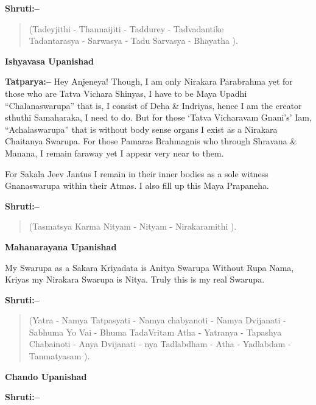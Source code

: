 \textbf{Shruti:–}

\begin{verse}
(Tadeyjithi - Thannaijiti - Taddurey - Tadvadantike \\ Tadantarasya - Sarwasya - Tadu Sarvasya - Bhayatha ).
\end{verse}

\begin{flushright}
\textbf{Ishyavasa Upanishad}
\end{flushright}

\textbf{Tatparya:–} Hey Anjeneya! Though, I am only Nirakara Parabrahma yet for those who are Tatva Vichara Shinyas, I have to be Maya Upadhi “Chalanaswarupa” that is, I consist of Deha \& Indriyas, hence I am the creator sthuthi Samaharaka, I need to do. But for those ‘Tatva Vicharavam Gnani's’ Iam, “Achalaswarupa” that is without body sense organs I exist as a Nirakara Chaitanya Swarupa. For those Pamaras Brahmagnis who through Shravana \& Manana, I remain faraway yet I appear very near to them.

For Sakala Jeev Jantus I remain in their inner bodies as a sole witness Gnanaswarupa within their Atmas. I also fill up this Maya Prapaneha.

\newpage

\textbf{Shruti:–}

\begin{verse}
(Tasmatsya Karma Nityam - Nityam - Nirakaramithi ).
\end{verse}

\begin{flushright}
\textbf{Mahanarayana Upanishad}
\end{flushright}

My Swarupa as a Sakara Kriyadata is Anitya Swarupa Without Rupa Nama, Kriyas my Nirakara Swarupa is Nitya. Truly this is my real Swarupa.

\textbf{Shruti:–}

\begin{verse}
(Yatra - Namya Tatpasyati - Namya chabyanoti - Namya Dvijanati - Sabhuma  Yo Vai - Bhuma Tada\break Vritam  Atha - Yatranya - Tapashya Chabainoti - Anya Dvijanati  - nya Tadlabdham - Atha - Yadlabdam - Tanmatyasam ).
\end{verse}

\begin{flushright}
\textbf{Chando Upanishad}
\end{flushright}

\textbf{Shruti:–}

